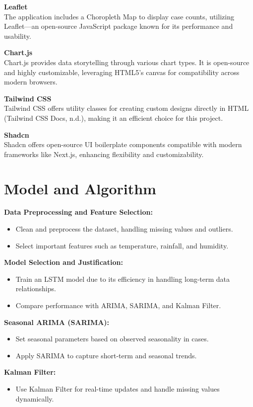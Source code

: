 \textbf{Leaflet} \\
The application includes a Choropleth Map to display case counts, utilizing Leaflet—an open-source JavaScript package known for its performance and usability.

\textbf{Chart.js} \\
Chart.js provides data storytelling through various chart types. It is open-source and highly customizable, leveraging HTML5's canvas for compatibility across modern browsers.

\textbf{Tailwind CSS} \\
Tailwind CSS offers utility classes for creating custom designs directly in HTML (Tailwind CSS Docs, n.d.), making it an efficient choice for this project.

\textbf{Shadcn} \\
Shadcn offers open-source UI boilerplate components compatible with modern frameworks like Next.js, enhancing flexibility and customizability.

\section{Model and Algorithm}
\textbf{Data Preprocessing and Feature Selection:}
\begin{itemize}
	\item Clean and preprocess the dataset, handling missing values and outliers.
	\item Select important features such as temperature, rainfall, and humidity.
\end{itemize}

\textbf{Model Selection and Justification:}
\begin{itemize}
	\item Train an LSTM model due to its efficiency in handling long-term data relationships.
	\item Compare performance with ARIMA, SARIMA, and Kalman Filter.
\end{itemize}

\textbf{Seasonal ARIMA (SARIMA):}
\begin{itemize}
	\item Set seasonal parameters based on observed seasonality in cases.
	\item Apply SARIMA to capture short-term and seasonal trends.
\end{itemize}

\textbf{Kalman Filter:}
\begin{itemize}
	\item Use Kalman Filter for real-time updates and handle missing values dynamically.
\end{itemize}

